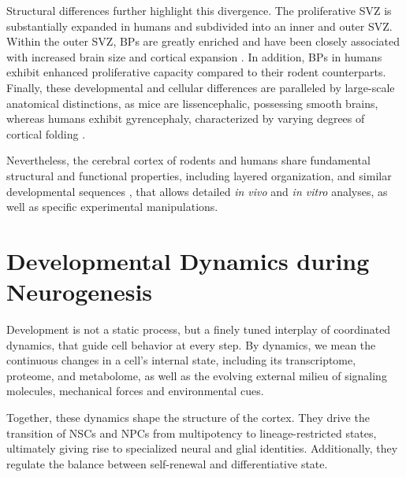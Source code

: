 Structural differences further highlight this divergence. The proliferative SVZ is substantially expanded in humans and subdivided into an inner and outer SVZ. Within the outer SVZ, BPs are greatly enriched and have been closely associated with increased brain size and cortical expansion \citep{reilloRoleIntermediateRadial2011}. In addition, BPs in humans exhibit enhanced proliferative capacity compared to their rodent counterparts. Finally, these developmental and cellular differences are paralleled by large-scale anatomical distinctions, as mice are lissencephalic, possessing smooth brains, whereas humans exhibit gyrencephaly, characterized by varying degrees of cortical folding \citep{BORRELLHowCellsFold2018}.

Nevertheless, the cerebral cortex of rodents and humans share fundamental structural and functional properties, including layered organization, and similar developmental sequences \citep{luhmannCanWeUnderstand2020},  that allows detailed \textit{in vivo} and \textit{in vitro} analyses, as well as 
specific experimental manipulations.


\section{Developmental Dynamics during Neurogenesis}
Development is not a static process, but a finely tuned interplay of coordinated dynamics, that guide cell behavior at every step. By dynamics, we mean the continuous changes in a cell’s internal state, including its transcriptome, proteome, and metabolome, as well as the evolving external milieu of signaling molecules, mechanical forces and environmental cues.

Together, these dynamics shape the structure of the cortex. They drive the transition of NSCs and NPCs from multipotency to lineage-restricted states, ultimately giving rise to specialized neural and glial identities. Additionally, they regulate the balance between self-renewal and differentiative state.

